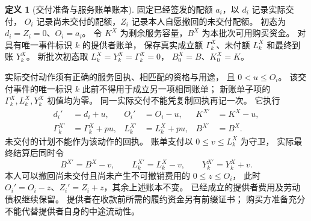\documentclass[UTF8,12pt,a4paper,openany,fontset=none,zihao=false]{ctexrep}
\theoremstyle{definition}
\newtheorem{definition}{定义}[chapter]
\newcommand{\1}{\mathbf 1}
\begin{document}
\begin{definition}[交付准备与服务账单账本]
\label{access:delivery-ledger}
固定已经签发的配额 \(a_i\)，以 \(d_i\) 记录实际交付，
\(O_i\) 记录尚未交付的配额，\(Z_i\) 记录本人自愿撤回的未交付配额。
初态为 \(d_i=Z_i=0\)、\(O_i=a_i\)。
令 \(K^X\) 为剩余服务容量，\(B^X\) 为本批次可用购买资金。
对具有唯一事件标识 \(k\) 的提供者账单，
保存真实成立额 \(\Gamma_k^X\)、未付额 \(L_k^X\) 和最终到账 \(Y_k^X\)。
新批次初态取 \(L_k^X=Y_k^X=\Gamma_k^X=0\)，
\(B_0^X=B\)、\(K_0^X=K\)。

实际交付动作须有正确的服务回执、相匹配的资格与用途，
且 \(0<u\le O_i\)。
该交付事件的唯一标识 \(k\) 此前不得用于成立另一项相同账单；
新账单子项的 \(\Gamma_k^X,L_k^X,Y_k^X\) 初值均为零。
同一实际交付不能凭复制回执再记一次。
它执行
\[
\begin{aligned}
d_i'&=d_i+u,&O_i'&=O_i-u,&K^{X\prime}&=K^X-u,\\
\Gamma_k^{X\prime}&=\Gamma_k^X+pu,&
L_k^{X\prime}&=L_k^X+pu,&B^{X\prime}&=B^X.
\end{aligned}
\]
未交付的计划不能作为该动作的回执。
账单支付以 \(0\le v\le L_k^X\) 为守卫，
实际最终结算后同时令
\[
B^{X\prime}=B^X-v,\qquad
L_k^{X\prime}=L_k^X-v,\qquad
Y_k^{X\prime}=Y_k^X+v.
\]
本人可以撤回尚未交付且尚未产生不可撤销费用的 \(0\le z\le O_i\)，
此时 \(O_i'=O_i-z\)、\(Z_i'=Z_i+z\)，其余上述账本不变。
已经成立的提供者费用及劳动债权继续保留。
提供者在收款前所需的履约资金另有前缀证书；
购买方准备充分不能代替提供者自身的中途流动性。
\end{definition}
\end{document}
